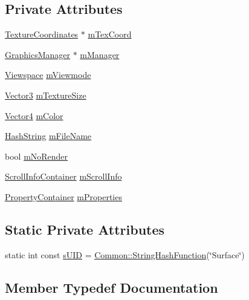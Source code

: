 \subsection*{Private Attributes}
\begin{DoxyCompactItemize}
\item 
\hyperlink{classTextureCoordinates}{Texture\+Coordinates} $\ast$ \hyperlink{classSurface_abc58ab23f3d82dd16ddb550d3173618e}{m\+Tex\+Coord}
\item 
\hyperlink{classGraphicsManager}{Graphics\+Manager} $\ast$ \hyperlink{classSurface_aeddc9c9fb4c768ecac85cbf146f4d3cd}{m\+Manager}
\item 
\hyperlink{Surface_8h_a4fa0651be6bee50d62c7c9166114f6fe}{Viewspace} \hyperlink{classSurface_a1d630bf18afc808bf7765e2203280b86}{m\+Viewmode}
\item 
\hyperlink{structVector3}{Vector3} \hyperlink{classSurface_a9d0d573b14332b5f3ee2d7e2cc78012c}{m\+Texture\+Size}
\item 
\hyperlink{structVector4}{Vector4} \hyperlink{classSurface_a4b8a0cac22eafc2bd5e02fab3ee7f309}{m\+Color}
\item 
\hyperlink{classHashString}{Hash\+String} \hyperlink{classSurface_acdac859d5653ee7f5e49c0e323001caf}{m\+File\+Name}
\item 
bool \hyperlink{classSurface_ab9c0d9fbb4968a7d5bb0cc785d24373b}{m\+No\+Render}
\item 
\hyperlink{classSurface_a7b781fa8ee9f22afe59f5aa871fd7b6e}{Scroll\+Info\+Container} \hyperlink{classSurface_a6582c39cc99bf1d6f67fc54db1134544}{m\+Scroll\+Info}
\item 
\hyperlink{classSurface_a7890ba0bba332887c7511468f10a8e85}{Property\+Container} \hyperlink{classSurface_a59a2b7281f8bad2a51f7e6b97d2d4962}{m\+Properties}
\end{DoxyCompactItemize}
\subsection*{Static Private Attributes}
\begin{DoxyCompactItemize}
\item 
static int const \hyperlink{classSurface_a44624ee5007ddfe4603c8f3d90e0222f}{s\+U\+ID} = \hyperlink{namespaceCommon_a994c43a8ea7b03968186a635687a6521}{Common\+::\+String\+Hash\+Function}(\char`\"{}Surface\char`\"{})
\end{DoxyCompactItemize}


\subsection{Member Typedef Documentation}
